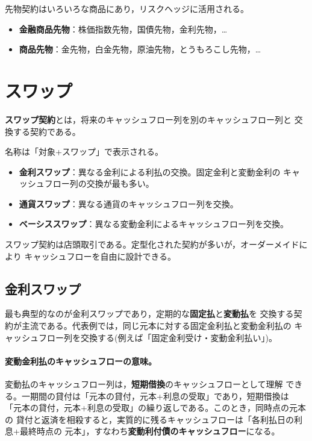 先物契約はいろいろな商品にあり，リスクヘッジに活用される。
\begin{itemize}
\item \textbf{金融商品先物}：株価指数先物，国債先物，金利先物，…
\item \textbf{商品先物}：金先物，白金先物，原油先物，とうもろこし先物，…
\end{itemize}

\section{スワップ}

\begin{definition}[スワップ契約]
\textbf{スワップ契約}とは，将来のキャッシュフロー列を別のキャッシュフロー列と
交換する契約である。
\end{definition}

名称は「対象+スワップ」で表示される。
\begin{itemize}
\item \textbf{金利スワップ}：異なる金利による利払の交換。固定金利と変動金利の
キャッシュフロー列の交換が最も多い。
\item \textbf{通貨スワップ}：異なる通貨のキャッシュフロー列を交換。
\item \textbf{ベーシススワップ}：異なる変動金利によるキャッシュフロー列を交換。
\end{itemize}

スワップ契約は店頭取引である。定型化された契約が多いが，オーダーメイドにより
キャッシュフローを自由に設計できる。

\subsection{金利スワップ}

最も典型的なのが金利スワップであり，定期的な\textbf{固定払}と\textbf{変動払}を
交換する契約が主流である。代表例では，同じ元本に対する固定金利払と変動金利払の
キャッシュフロー列を交換する(例えば「固定金利受け・変動金利払い」)。

\paragraph{変動金利払のキャッシュフローの意味。}
変動払のキャッシュフロー列は，\textbf{短期借換}のキャッシュフローとして理解
できる。一期間の貸付は「元本の貸付，元本+利息の受取」であり，短期借換は
「元本の貸付，元本+利息の受取」の繰り返しである。このとき，同時点の元本の
貸付と返済を相殺すると，実質的に残るキャッシュフローは「各利払日の利息+最終時点の
元本」，すなわち\textbf{変動利付債のキャッシュフロー}になる。

